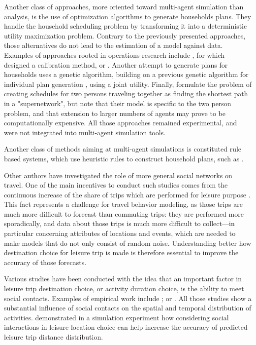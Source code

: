 {Another class of approaches, more oriented toward multi-agent simulation than analysis, is the use of optimization algorithms to generate households plans. They handle the household scheduling problem by transforming it into a deterministic utility maximization problem. Contrary to the previously presented approaches, those alternatives do not lead to the estimation of a model against data. Examples of approaches rooted in operations research include \citet{Recker_TRR_1995}, for which \citet{ChowRecker_TranResB_2012} designed a calibration method, or \citet{GanRecker_TransResB_2008}. Another attempt to generate plans for households uses a genetic algorithm, building on a previous genetic algorithm for individual plan generation \citep{CharyparNagel_Transportation_2005, MeisterEtAl_Transportation_2005}, using a joint utility. Finally, \citet{LiaoFEtAl_Transportation_2013} formulate the problem of creating schedules for two persons traveling together as finding the shortest path in a "supernetwork", but note that their model is specific to the two person problem, and that extension to larger numbers of agents may prove to be computationally expensive. All those approaches remained experimental, and were not integrated into multi-agent simulation tools.

Another class of methods aiming at multi-agent simulations is constituted rule based systems, which use heuristic rules to construct household plans, such as \citet{MillerEtAl_Transportation_2005, ArentzeTimmermans_TransResB_2009}.

Other authors have investigated the role of more general social networks on travel. One of the main incentives to conduct such studies comes from the continuous increase of the share of trips which are performed for leisure purpose \citep{SchlichEtAl_TransportRev_2004,Axhausen_DonaghyEtAl_2005}. This fact represents a challenge for travel behavior modeling, as those trips are much more difficult to forecast than commuting trips: they are performed more sporadically, and data about those trips is much more difficult to collect---in particular concerning attributes of locations and events, which are needed to make models that do not only consist of random noise. Understanding better how destination choice for leisure trip is made is therefore essential to improve the accuracy of those forecasts.

Various studies have been conducted with the idea that an important factor in leisure trip destination choice, or activity duration choice, is the ability to meet social contacts. Examples of empirical work include \citet{CarrascoJAHabib_IATBR_2009}; \citet{HabibCarrascoJA_TRR_2011} or \citet{MooreJEtAl_Transportation_2013}. All those studies show a substantial influence of social contacts on the spatial and temporal distribution of activities. \citet{Frei_PhDThesis_2012} demonstrated in a simulation experiment how considering social interactions in leisure location choice can help increase the accuracy of predicted leisure trip distance distribution.

}
